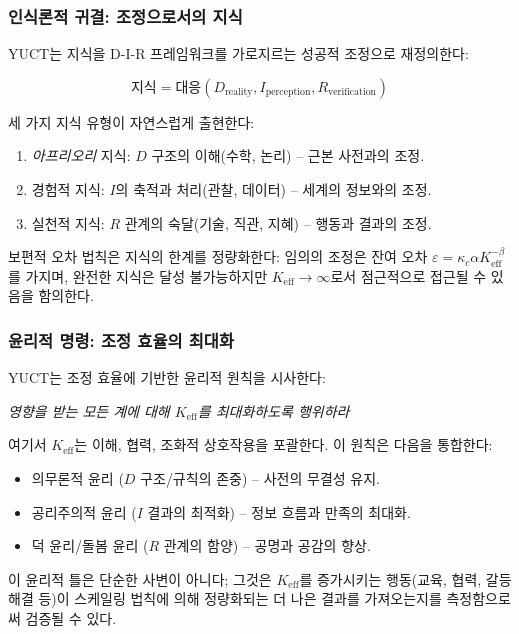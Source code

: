 \documentclass[12pt,a4paper]{article}
\newcommand{\eff}{\mathrm{eff}}
\newcommand{\Ke}{K_{\eff}}
\begin{document}
	\subsubsection{인식론적 귀결: 조정으로서의 지식}
	
	YUCT는 지식을 D-I-R 프레임워크를 가로지르는 성공적 조정으로 재정의한다:
	
	\[
	\text{지식} = \text{대응}(D_{\text{reality}}, I_{\text{perception}}, R_{\text{verification}})
	\]
	
	세 가지 지식 유형이 자연스럽게 출현한다:
	\begin{enumerate}
		\item \textit{아프리오리} 지식: $D$ 구조의 이해(수학, 논리) – 근본 사전과의 조정.
		\item 경험적 지식: $I$의 축적과 처리(관찰, 데이터) – 세계의 정보와의 조정.
		\item 실천적 지식: $R$ 관계의 숙달(기술, 직관, 지혜) – 행동과 결과의 조정.
	\end{enumerate}
	
	보편적 오차 법칙은 지식의 한계를 정량화한다: 임의의 조정은 잔여 오차 $\varepsilon = \kappa_c \alpha \Ke^{-\beta}$를 가지며, 완전한 지식은 달성 불가능하지만 \(\Ke \to \infty\)로서 점근적으로 접근될 수 있음을 함의한다.
	
	\subsubsection{윤리적 명령: 조정 효율의 최대화}
	
	YUCT는 조정 효율에 기반한 윤리적 원칙을 시사한다:
	
	\begin{center}
		\textit{영향을 받는 모든 계에 대해 \(\Ke\)를 최대화하도록 행위하라}
	\end{center}
	
	여기서 \(\Ke\)는 이해, 협력, 조화적 상호작용을 포괄한다. 이 원칙은 다음을 통합한다:
	\begin{itemize}
		\item 의무론적 윤리 ($D$ 구조/규칙의 존중) – 사전의 무결성 유지.
		\item 공리주의적 윤리 ($I$ 결과의 최적화) – 정보 흐름과 만족의 최대화.
		\item 덕 윤리/돌봄 윤리 ($R$ 관계의 함양) – 공명과 공감의 향상.
	\end{itemize}
	
	이 윤리적 틀은 단순한 사변이 아니다; 그것은 \(\Ke\)를 증가시키는 행동(교육, 협력, 갈등 해결 등)이 스케일링 법칙에 의해 정량화되는 더 나은 결과를 가져오는지를 측정함으로써 검증될 수 있다.
	
\end{document}
